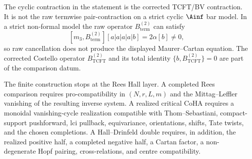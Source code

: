 \begin{proposition}
The cyclic contraction in the statement is the corrected TCFT/BV
contraction. It is not the raw termwise pair-contraction on a strict
cyclic $\Ainf$ bar model. In a strict non-formal model the raw operator
$B_{\mathrm{term}}^{(2)}$ can satisfy
\[
 [m_3,B_{\mathrm{term}}^{(2)}][a|a|a|a|b]=2\alpha[b]\neq0,
\]
so raw cancellation does not produce the displayed Maurer--Cartan
equation. The corrected Costello operator
$B_{\mathrm{TCFT}}^{(2)}$ and its total identity
\(\{b,B_{\mathrm{TCFT}}^{(2)}\}=0\) are part of the comparison datum.

The finite construction stops at the Rees Hall layer. A completed Rees
comparison requires pro-compatibility in $(N,r,L,m)$ and the
Mittag--Leffler vanishing of the resulting inverse system. A realized
critical CoHA requires a monoidal vanishing-cycle realization
compatible with Thom--Sebastiani, compact-support pushforward,
lci pullback, equivariance, orientations, shifts, Tate twists, and the
chosen completions. A Hall--Drinfeld double requires, in addition, the
realized positive half, a completed negative half, a Cartan factor, a
non-degenerate Hopf pairing, cross-relations, and centre
compatibility.
\end{proposition}

